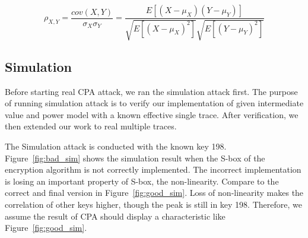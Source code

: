 \documentclass{article}
\begin{document}
\begin{equation}
  \rho_{X,Y}=\frac{cov(X, Y)}{\sigma_X\sigma_Y}=\frac{E\left[(X-\mu_X)(Y-\mu_Y)\right]}{\sqrt{E\left[(X-\mu_X)^2\right]}\sqrt{E\left[(Y-\mu_Y)^2\right]}}
  \label{eq:corr}
\end{equation}

\subsection{Simulation}
Before starting real CPA attack, we ran the simulation attack first. The purpose of running simulation attack is to verify our implementation of given intermediate value and power model with a known effective single trace. After verification, we then extended our work to real multiple traces.

The Simulation attack is conducted with the known key 198. Figure~\ref{fig:bad_sim} shows the simulation result when the S-box of the encryption algorithm is not correctly implemented. The incorrect implementation is losing an important property of S-box, the non-linearity. Compare to the correct and final version in Figure~\ref{fig:good_sim}. Loss of non-linearity makes the correlation of other keys higher, though the peak is still in key 198. Therefore, we assume the result of CPA should display a characteristic like Figure~\ref{fig:good_sim}.
\end{document}
